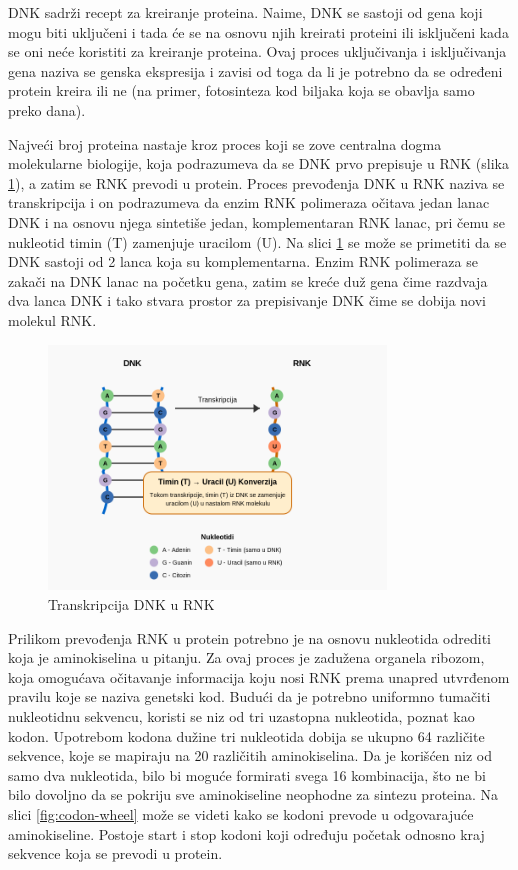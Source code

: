 \documentclass[12pt,oneside]{memoir}
\begin{document}
DNK sadrži recept za kreiranje proteina. Naime, DNK se sastoji od gena koji mogu biti uključeni i tada će se na osnovu njih kreirati proteini ili isključeni kada se oni neće koristiti za kreiranje proteina. Ovaj proces uključivanja i isključivanja gena naziva se genska ekspresija i zavisi od toga da li je potrebno da se određeni protein kreira ili ne (na primer, fotosinteza kod biljaka koja se obavlja samo preko dana).

Najveći broj proteina nastaje kroz proces koji se zove centralna dogma molekularne biologije, koja podrazumeva da se DNK prvo prepisuje u RNK (slika \ref{fig:transkripcija}), a zatim se RNK prevodi u protein. Proces prevođenja DNK u RNK naziva se transkripcija i on podrazumeva da enzim RNK polimeraza očitava jedan lanac DNK i na osnovu njega sintetiše jedan, komplementaran RNK lanac, pri čemu se nukleotid timin (T) zamenjuje uracilom (U). Na slici \ref{fig:transkripcija} se može se primetiti da se DNK sastoji od 2 lanca koja su komplementarna. Enzim RNK polimeraza se zakači na DNK lanac na početku gena, zatim se kreće duž gena čime razdvaja dva lanca DNK i tako stvara prostor za prepisivanje DNK čime se dobija novi molekul RNK.

\begin{figure}[h]
  \centering
  \includegraphics[width=0.8\textwidth]{images/dna_rna_transcription_diagram.png}
  \caption{Transkripcija DNK u RNK}
  \label{fig:transkripcija}
\end{figure}

Prilikom prevođenja RNK u protein potrebno je na osnovu nukleotida odrediti koja je aminokiselina u pitanju. Za ovaj proces je zadužena organela ribozom, koja omogućava očitavanje informacija koju nosi RNK prema unapred utvrđenom pravilu koje se naziva genetski kod. Budući da je potrebno uniformno tumačiti nukleotidnu sekvencu, koristi se niz od tri uzastopna nukleotida, poznat kao kodon. Upotrebom kodona dužine tri nukleotida dobija se ukupno 64 različite sekvence, koje se mapiraju na 20 različitih aminokiselina. Da je korišćen niz od samo dva nukleotida, bilo bi moguće formirati svega 16 kombinacija, što ne bi bilo dovoljno da se pokriju sve aminokiseline neophodne za sintezu proteina. Na slici \ref{fig:codon-wheel} može se videti kako se kodoni prevode u odgovarajuće aminokiseline. Postoje start i stop kodoni koji određuju početak odnosno kraj sekvence koja se prevodi u protein.
\end{document}
